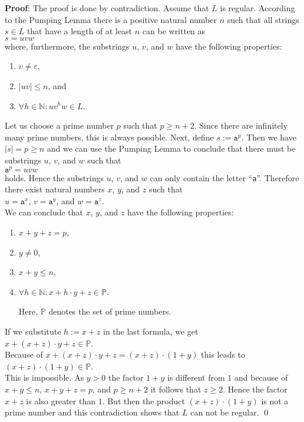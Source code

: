 \noindent
\textbf{Proof}:
The proof is done by contradiction.  Assume that $L$ is regular.  According to the Pumping Lemma there is a
positive natural number $n$ such that all strings $s \in L$ that have a length of at least $n$ can be written as
\\[0.2cm]
\hspace*{1.3cm}
$s = uvw$
\\[0.2cm]
where, furthermore, the substrings $u$, $v$, and $w$ have the following properties:
\begin{enumerate}
\item $v \not= \varepsilon$, 
\item $|uv| \leq n$, \quad and
\item $\forall h \in \mathbb{N}: u v^h w \in L$.
\end{enumerate}
Let us choose a prime number $p$ such that $p \geq n + 2$.
Since there are infinitely many prime numbers, this
is always possible.  Next,  define $s := \mathtt{a}^p$.
Then we have $|s| = p \geq n$ and we can use the Pumping Lemma to conclude that there must be substrings $u$,
$v$, and $w$ such that
\\[0.2cm]
\hspace*{1.3cm}
$\mathtt{a}^p = uvw$ 
\\[0.2cm]
holds.
Hence the substrings $u$, $v$, and $w$ can only contain the letter ``\texttt{a}''.  Therefore there exist
natural numbers $x$, $y$, and $z$ such that
\\[0.2cm]
\hspace*{1.3cm}
$u = \mathtt{a}^x$, \quad $v = \mathtt{a}^y$, \quad and \quad $w = \mathtt{a}^z$.
\\[0.2cm]
We can conclude that  $x$, $y$, and $z$ have the following properties:
\begin{enumerate}
\item $x + y + z = p$,
\item $y \not= 0$,
\item $x + y \leq n$,
\item $\forall h \in \mathbb{N}: x + h \cdot y + z \in \mathbb{P}$.

      Here, $\mathbb{P}$ denotes the set of prime numbers.
\end{enumerate}
If we substitute $h := x + z$ in the last formula, we get
\\[0.2cm]
\hspace*{1.3cm}
$x + (x + z)\cdot y + z \in \mathbb{P}$.
\\[0.2cm]
Because of $x + (x + z)\cdot y + z = (x + z) \cdot (1 + y)$ this leads to
\\[0.2cm]
\hspace*{1.3cm}
$(x + z) \cdot (1 + y) \in \mathbb{P}$.
\\[0.2cm]
This is impossible. As $y > 0$ the factor $1 + y$ is different from $1$
and because of $x + y \leq n$, $x + y + z = p$, and $p \geq n + 2$ it follows that
$z \geq 2$.  Hence the factor $x + z$ is also greater than $1$.  But then the product
$(x + z) \cdot (1 + y)$ is not a prime number and this contradiction shows that $L$ can not be regular.
\qed


